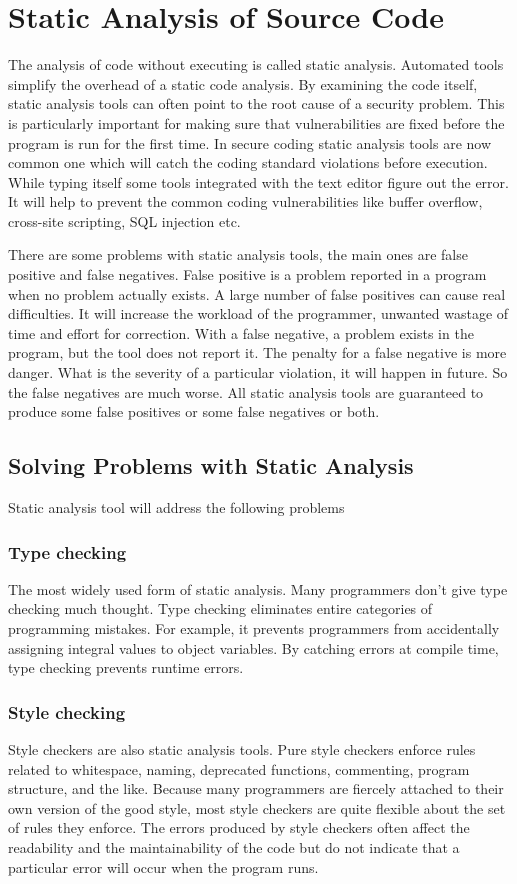 \section{Static Analysis of Source Code}\cite{chess2007secure}
The analysis of code without executing is called static analysis. Automated tools simplify the overhead of a static code analysis. By examining the code itself, static analysis tools can often point to the
root cause of a security problem. This is
particularly important for making sure that vulnerabilities are fixed
before the program is run for the first time. In secure coding static analysis tools are now common one which will catch the coding standard violations before execution. While typing itself some tools integrated with the text editor figure out the error.  It will help to prevent the common coding vulnerabilities like buffer overflow, cross-site scripting, SQL injection etc.

There are some problems with static analysis tools, the main ones are false positive and false negatives. False positive is a problem reported in a program when no problem actually
exists. A large number of false positives can cause real difficulties. It will increase the workload of the programmer, unwanted wastage of time and effort for correction. With a false negative, a problem exists in the
program, but the tool does not report it. The penalty for a false
negative is more danger. What is the severity of a particular violation, it will happen in future. So the false negatives are much worse. All static analysis tools are guaranteed to produce some false positives
or some false negatives or both.
\subsection{Solving Problems with Static Analysis}

Static analysis tool will address the following problems
\subsubsection{Type checking}
The most widely used form of static analysis. Many programmers don’t give
type checking much thought. Type checking
eliminates entire categories of programming mistakes. For example, it prevents programmers from accidentally assigning integral values to object
variables. By catching errors at compile time, type checking prevents runtime errors.
\subsubsection{Style checking}
Style checkers are also static analysis tools. Pure style checkers
enforce rules related to whitespace, naming, deprecated functions, commenting, program structure, and the like. Because many programmers are
fiercely attached to their own version of the good style, most style checkers are
quite flexible about the set of rules they enforce. The errors produced by
style checkers often affect the readability and the maintainability of the
code but do not indicate that a particular error will occur when the program runs.
